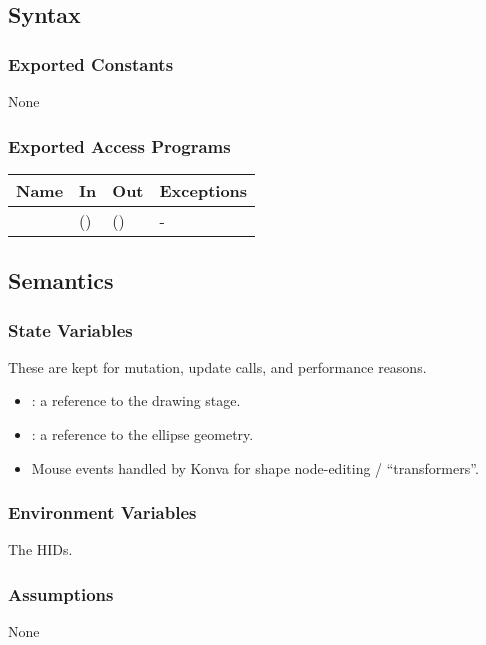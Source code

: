 \documentclass[12pt, titlepage]{article}
\begin{document}
\subsection{Syntax}

\subsubsection{Exported Constants}
None
\subsubsection{Exported Access Programs}

\begin{center}
\begin{tabular}{L{5cm} L{4cm} L{4cm} L{2cm}}
\hline
\textbf{Name} & \textbf{In} & \textbf{Out} & \textbf{Exceptions} \\
\hline
{} &  () &  () & - \\
\hline
\end{tabular}
\end{center}

\subsection{Semantics}

\subsubsection{State Variables}
These are kept for mutation, update calls, and performance reasons.
\begin{itemize}
  \item {}: a reference to the drawing stage.
  \item {}: a reference to the ellipse geometry.
  \item Mouse events handled by Konva for shape node-editing / ``transformers''.
\end{itemize}

\subsubsection{Environment Variables}
The HIDs.

\subsubsection{Assumptions}
None
\end{document}
